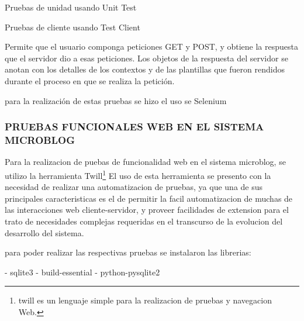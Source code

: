 Pruebas de unidad usando Unit Test

Pruebas de cliente usando Test Client

Permite que el usuario componga peticiones GET y POST, y obtiene la respuesta que el servidor dio a esas peticiones. Los objetos de la respuesta del servidor se anotan con los detalles de los contextos y de las plantillas que fueron rendidos durante el proceso en que se realiza la petición.

para la realización de estas pruebas se hizo el uso se Selenium 

\subsubsection{PRUEBAS FUNCIONALES WEB EN EL SISTEMA MICROBLOG}
Para la realizacion de puebas de funcionalidad web en el sistema microblog, se utilizo la herramienta Twill\footnote{twill es un lenguaje simple para la realizacion de pruebas y navegacion Web.}
El uso de esta herramienta se presento con la necesidad de realizar una automatizacion de pruebas, ya que una de sus principales caracteristicas es el de permitir la facil
automatizacion de muchas de las interacciones web cliente-servidor, y proveer facilidades de extension para el trato de necesidades complejas requeridas en el transcurso de la evolucion del
desarrollo del sistema.

para poder realizar las respectivas pruebas se instalaron las librerias:

- sqlite3
- build-essential
- python-pysqlite2

%
